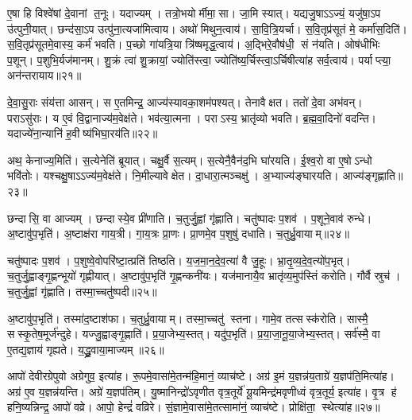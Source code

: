 ए॒षा हि विश्वे॑षां दे॒वानां त॒नूः।
यदाज्यम्।
तत्रो॒भयोर्मीमा॒सा।
जा॒मि स्यात्।
यद्यजु॒षाऽऽज्यं॒ यजु॑षा॒ऽप उ॑त्पुनी॒यात्।
छन्द॑सा॒ऽप उत्पु॑ना॒त्यजा॑मित्वाय।
अथो॑ मिथुन॒त्वाय॑।
सा॒वि॒त्रि॒यर्चा।
स॒वि॒तृप्र॑सूतं मे॒ कर्मा॑स॒दिति॑।
स॒वि॒तृप्र॑सूतमे॒वास्य॒ कर्म॑ भवति।
प॒च्छो गा॑यत्रि॒या त्रि॑ष्षमृद्ध॒त्वाय॑।
अ॒द्भिरे॒वौष॑धी॒ सं न॑यति।
ओष॑धीभिः प॒शून्।
प॒शुभि॒र्यज॑मानम्।
शु॒क्रं त्वा॑ शु॒क्रायां॒ ज्योति॑स्त्वा॒ ज्योति॑ष्य॒र्चिस्त्वा॒ऽर्चिषीत्या॑ह सर्व॒त्वाय॑।
पर्याप्त्या॒ अन॑न्तरायाय॥२१॥\anuvakamend[ई॒क्ष॒त॒ आ॒ह॒ शा॒स्ते॒ लो॒का दे॒वता॑ भवति॒ षट् च॑]

दे॒वा॒सु॒राः संय॑त्ता आसन्।
स ए॒तमिन्द्र॒ आज्य॑स्यावका॒शम॑पश्यत्।
तेनावैक्षत।
ततो॑ दे॒वा अभ॑वन्।
पराऽसु॑राः।
य ए॒वं वि॒द्वानाज्य॑म॒वेक्ष॑ते।
भव॑त्या॒त्मना।
पराऽस्य॒ भ्रातृ॑व्यो भवति।
ब्र॒ह्म॒वा॒दिनो॑ वदन्ति।
यदाज्ये॑ना॒न्यानि॑ ह॒वीष्य॑भिघा॒रय॑ति॥२२॥

अथ॒ केनाज्य॒मिति॑।
स॒त्येनेति॑ ब्रूयात्।
चक्षु॒र्वै स॒त्यम्।
स॒त्येनै॒वैन॑द॒भि घा॑रयति।
ई॒श्व॒रो वा ए॒षोऽन्धो भवि॑तोः।
यश्चक्षु॒षाऽऽज्य॑म॒वेक्ष॑ते।
नि॒मील्यावेक्षेत।
दा॒धारा॒त्मञ्चक्षु॑।
अ॒भ्याज्य॑ङ्घारयति।
आज्य॑ङ्गृह्णाति॥२३॥

छन्दासि॒ वा आज्यम्।
छन्दास्ये॒व प्री॑णाति।
च॒तुर्जु॒ह्वां गृ॑ह्णाति।
चतु॑ष्पादः प॒शव॑।
प॒शूने॒वाव॑ रुन्धे।
अ॒ष्टावु॑प॒भृति॑।
अ॒ष्टाक्ष॑रा गाय॒त्री।
गा॒य॒त्रः प्रा॒णः।
प्रा॒णमे॒व प॒शुषु॑ दधाति।
च॒तुर्ध्रु॒वायाम्॥२४॥

चतु॑ष्पादः प॒शव॑।
प॒शुष्वे॒वोपरि॑ष्टा॒त्प्रति॑ तिष्ठति।
य॒ज॒मा॒न॒दे॒व॒त्या॑ वै जु॒हूः।
भ्रा॒तृ॒व्य॒दे॒व॒त्यो॑प॒भृत्।
च॒तुर्जु॒ह्वाङ्गृ॒ह्णन्भूयो॑ गृह्णीयात्।
अ॒ष्टावु॑प॒भृति॑ गृ॒ह्णन्कनी॑यः।
यज॑मानायै॒व भ्रातृ॑व्य॒मुप॑स्तिं करोति।
गौर्वै स्रुच॑।
च॒तुर्जु॒ह्वां गृ॑ह्णाति।
तस्मा॒च्चतु॑ष्पदी॥२५॥

अ॒ष्टावु॑प॒भृति॑।
तस्मा॑द॒ष्टाश॑फा।
च॒तुर्ध्रु॒वायाम्।
तस्मा॒च्चतु॑ स्तना।
गामे॒व तत्सस्क॑रोति।
सास्मै॒ सस्कृ॒तेष॒मूर्ज॑न्दुहे।
यज्जु॒ह्वाङ्गृ॒ह्णाति॑।
प्र॒या॒जेभ्य॒स्तत्।
यदु॑प॒भृति॑।
प्र॒या॒जा॒नू॒या॒जेभ्य॒स्तत्।
सर्व॑स्मै॒ वा ए॒तद्य॒ज्ञाय॑ गृह्यते।
य॒द्ध्रु॒वाया॒माज्यम्॥२६॥\anuvakamend[अ॒भि॒घा॒रय॑ति गृह्णाति ध्रु॒वाया॒ञ्चतु॑ष्पदी प्रयाजानूया॒जेभ्य॒स्तद्द्वे च॑]

आपो॑ देवीरग्रेपुवो अग्रेगुव॒ इत्या॑ह।
रू॒पमे॒वासा॑मे॒तन्म॑हि॒मानं॒ व्याच॑ष्टे।
अग्र॑ इ॒मं य॒ज्ञन्न॑य॒ताग्रे॑ य॒ज्ञप॑ति॒मित्या॑ह।
अग्र॑ ए॒व य॒ज्ञन्न॑यन्ति।
अग्रे॑ य॒ज्ञप॑तिम्।
यु॒ष्मानिन्द्रो॑ऽवृणीत वृत्र॒तूर्ये॑ यू॒यमिन्द्र॑मवृणीध्वं वृत्र॒तूर्य॒ इत्या॑ह।
वृ॒त्र ह॑ हनि॒ष्यन्निन्द्र॒ आपो॑ वव्रे।
आपो॒ हेन्द्रं॑ वव्रिरे।
सं॒ज्ञामे॒वासा॑मे॒तत्सामा॑नं॒ व्याच॑ष्टे।
प्रोक्षि॑ता॒ स्थेत्या॑ह॥२७॥

